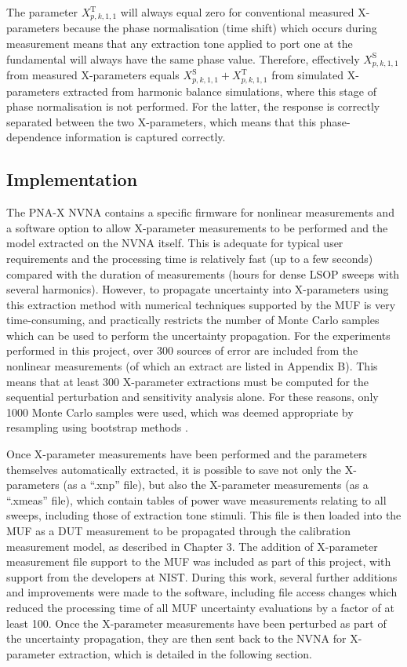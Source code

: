 \documentclass[../thesis/thesis.tex]{subfiles}
\begin{document}
The parameter $X^\textrm{T}_{p,k, 1, 1}$ will always equal zero for conventional measured X-parameters because the phase normalisation (time shift) which occurs during measurement means that any extraction tone applied to port one at the fundamental will always have the same phase value. Therefore, effectively $X^\textrm{S}_{p,k, 1, 1}$ from measured X-parameters equals $X^\textrm{S}_{p,k, 1, 1} + X^\textrm{T}_{p,k, 1, 1}$ from simulated X-parameters extracted from harmonic balance simulations, where this stage of phase normalisation is not performed. For the latter, the response is correctly separated between the two X-parameters, which means that this phase-dependence information is captured correctly. 

\subsection{Implementation}

The PNA-X NVNA contains a specific firmware for nonlinear measurements and a software option to allow X-parameter measurements to be performed and the model extracted on the NVNA itself. This is adequate for typical user requirements and the processing time is relatively fast (up to a few seconds) compared with the duration of measurements (hours for dense LSOP sweeps with several harmonics). However, to propagate uncertainty into X-parameters using this extraction method with numerical techniques supported by the MUF is very time-consuming, and practically restricts the number of Monte Carlo samples which can be used to perform the uncertainty propagation. For the experiments performed in this project, over 300 sources of error are included from the nonlinear measurements (of which an extract are listed in Appendix B). This means that at least 300 X-parameter extractions must be computed for the sequential perturbation and sensitivity analysis alone. For these reasons, only 1000 Monte Carlo samples were used, which was deemed appropriate by resampling using bootstrap methods \cite{Chernick_2008}.

Once X-parameter measurements have been performed and the parameters themselves automatically extracted, it is possible to save not only the X-parameters (as a ``.xnp'' file), but also the X-parameter measurements (as a ``.xmeas'' file), which contain tables of power wave measurements relating to all sweeps, including those of extraction tone stimuli. This file is then loaded into the MUF as a DUT measurement to be propagated through the calibration measurement model, as described in Chapter 3. The addition of X-parameter measurement file support to the MUF was included as part of this project, with support from the developers at NIST. During this work, several further additions and improvements were made to the software, including file access changes which reduced the processing time of all MUF uncertainty evaluations by a factor of at least 100. Once the X-parameter measurements have been perturbed as part of the uncertainty propagation, they are then sent back to the NVNA for X-parameter extraction, which is detailed in the following section.
\end{document}
